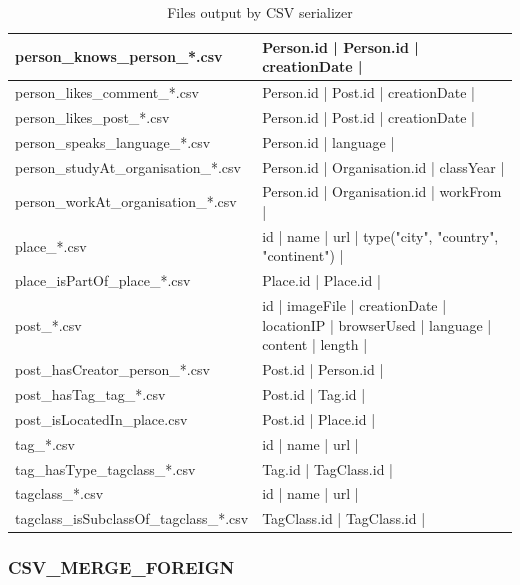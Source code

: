 \begin{table}[htbp]
{\begin{minipage}[c]{\textheight}
\begin{tabular}{|p{5cm}|p{19cm}|}
            person\_knows\_person\_*.csv & Person.id | Person.id | creationDate |\\
            \hline
            person\_likes\_comment\_*.csv & Person.id | Post.id | creationDate |\\
            \hline
            person\_likes\_post\_*.csv & Person.id | Post.id | creationDate |\\
            \hline
            person\_speaks\_language\_*.csv & Person.id | language |\\
            \hline
            person\_studyAt\_organisation\_*.csv & Person.id | Organisation.id | classYear |\\
            \hline
            person\_workAt\_organisation\_*.csv &  Person.id | Organisation.id | workFrom |\\
            \hline
            place\_*.csv & id | name | url | type({"city", "country", "continent"}) |\\
            \hline
            place\_isPartOf\_place\_*.csv & Place.id | Place.id |\\
            \hline
            post\_*.csv & id | imageFile | creationDate | locationIP | browserUsed | language | content | length |\\
            \hline
            post\_hasCreator\_person\_*.csv & Post.id | Person.id |\\
            \hline
            post\_hasTag\_tag\_*.csv & Post.id | Tag.id |\\
            \hline
            post\_isLocatedIn\_place.csv & Post.id | Place.id |\\
            \hline
            tag\_*.csv & id | name | url | \\
            \hline
            tag\_hasType\_tagclass\_*.csv & Tag.id | TagClass.id |\\
            \hline
            tagclass\_*.csv & id | name | url | \\
            \hline
            tagclass\_isSubclassOf\_tagclass\_*.csv & TagClass.id | TagClass.id |\\
            \hline
        \end{tabular}
        \caption{Files output by CSV serializer}
        \label{table:csv}
	\end{minipage}
	}
\end{table}




\subsubsection{CSV\_MERGE\_FOREIGN}

